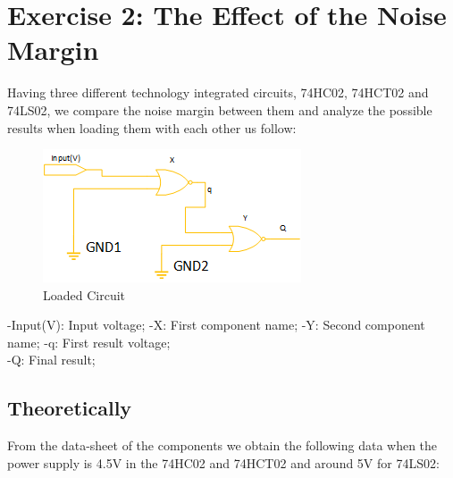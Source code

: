 



%
%
%

\section{\color{olive}Exercise 2: The Effect of the Noise Margin}

Having three different technology integrated circuits, 74HC02, 74HCT02 and 74LS02, we compare the noise margin between them and analyze the possible results when loading them with each other us follow:

\begin{figure}[h!]
        \centering
        \includegraphics[scale=1]{circuit2.png}
        \caption{\color{cyan}Loaded Circuit}
        \label{fig:ej2cir}
\end{figure}

-Input(V): Input voltage; 
-X: First component name; 
-Y: Second component name; 
-q: First result voltage; \\
-Q: Final result;

	\subsection{\color{purple}Theoretically}
	
	 From the data-sheet of the components we obtain the following data when the power supply is 4.5V in the 74HC02 and 74HCT02 and around 5V for 74LS02:
	 
